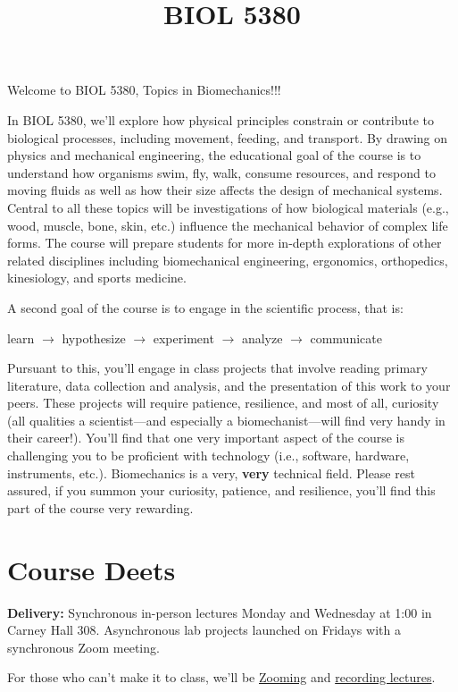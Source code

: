 \documentclass[
]{article}
\title{BIOL 5380}
\author{}
\date{\vspace{-2.5em}}
\begin{document}
\maketitle

Welcome to BIOL 5380, Topics in Biomechanics!!!

In BIOL 5380, we'll explore how physical principles constrain or
contribute to biological processes, including movement, feeding, and
transport. By drawing on physics and mechanical engineering, the
educational goal of the course is to understand how organisms swim, fly,
walk, consume resources, and respond to moving fluids as well as how
their size affects the design of mechanical systems. Central to all
these topics will be investigations of how biological materials (e.g.,
wood, muscle, bone, skin, etc.) influence the mechanical behavior of
complex life forms. The course will prepare students for more in-depth
explorations of other related disciplines including biomechanical
engineering, ergonomics, orthopedics, kinesiology, and sports medicine.

A second goal of the course is to engage in the scientific process, that
is:

learn \(\rightarrow\) hypothesize \(\rightarrow\) experiment
\(\rightarrow\) analyze \(\rightarrow\) communicate

Pursuant to this, you'll engage in class projects that involve reading
primary literature, data collection and analysis, and the presentation
of this work to your peers. These projects will require patience,
resilience, and most of all, curiosity (all qualities a scientist---and
especially a biomechanist---will find very handy in their career!).
You'll find that one very important aspect of the course is challenging
you to be proficient with technology (i.e., software, hardware,
instruments, etc.). Biomechanics is a very, \textbf{very} technical
field. Please rest assured, if you summon your curiosity, patience, and
resilience, you'll find this part of the course very rewarding.

\hypertarget{course-deets}{%
\section{Course Deets}\label{course-deets}}

\textbf{Delivery:} Synchronous in-person lectures Monday and Wednesday
at 1:00 in Carney Hall 308. Asynchronous lab projects launched on
Fridays with a synchronous Zoom meeting.

For those who can't make it to class, we'll be
\href{https://bccte.zoom.us/j/9533582156}{Zooming} and
\href{https://bostoncollege.instructure.com/courses/1615104/external_tools/109499}{recording
lectures}.
\end{document}
